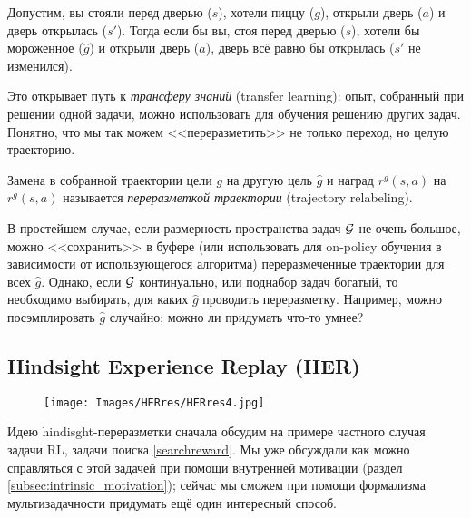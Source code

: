 \begin{example}
Допустим, вы стояли перед дверью ($s$), хотели пиццу ($g$), открыли дверь ($a$) и дверь открылась ($s'$). Тогда если бы вы, стоя перед дверью ($s$), хотели бы мороженное ($\hat{g}$) и открыли дверь ($a$), дверь всё равно бы открылась ($s'$ не изменился).
\end{example}

Это открывает путь к \emph{трансферу знаний} (transfer learning): опыт, собранный при решении одной задачи, можно использовать для обучения решению других задач. Понятно, что мы так можем <<переразметить>> не только переход, но целую траекторию.

\begin{definition}
Замена в собранной траектории цели $g$ на другую цель $\hat{g}$ и наград $r^g(s, a)$ на $r^{\hat{g}}(s, a)$ называется \emph{переразметкой траектории} (trajectory relabeling). 
\end{definition}

В простейшем случае, если размерность пространства задач $\mathcal{G}$ не очень большое, можно <<сохранить>> в буфере (или использовать для on-policy обучения в зависимости от использующегося алгоритма) переразмеченные траектории для всех $\hat{g}$. Однако, если $\mathcal{G}$ континуально, или поднабор задач богатый, то необходимо выбирать, для каких $\hat{g}$ проводить переразметку. Например, можно посэмплировать $\hat{g}$ случайно; можно ли придумать что-то умнее?

\subsection{Hindsight Experience Replay (HER)}

\begin{wrapfigure}{l}{0.3\textwidth}
\vspace{-0.7cm}
\centering
\texttt{[image: Images/HERres/HERres4.jpg]}
\vspace{-0.7cm}
\end{wrapfigure}

Идею hindisght-переразметки сначала обсудим на примере частного случая задачи RL, задачи поиска \eqref{searchreward}. Мы уже обсуждали как можно справляться с этой задачей при помощи внутренней мотивации (раздел \ref{subsec:intrinsic_motivation}); сейчас мы сможем при помощи формализма мультизадачности придумать ещё один интересный способ.

